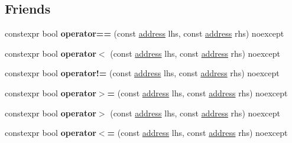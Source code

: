 \subsection*{Friends}
\begin{DoxyCompactItemize}
\item 
\mbox{\label{classdistant_1_1memory_1_1address_a8eefa780ab985fb77d69cbeaf4d82ad4}} 
constexpr bool {\bfseries operator==} (const \mbox{\hyperlink{classdistant_1_1memory_1_1address}{address}} lhs, const \mbox{\hyperlink{classdistant_1_1memory_1_1address}{address}} rhs) noexcept
\item 
\mbox{\label{classdistant_1_1memory_1_1address_ab78b2b70518bd59568ad03507bf938ae}} 
constexpr bool {\bfseries operator$<$} (const \mbox{\hyperlink{classdistant_1_1memory_1_1address}{address}} lhs, const \mbox{\hyperlink{classdistant_1_1memory_1_1address}{address}} rhs) noexcept
\item 
\mbox{\label{classdistant_1_1memory_1_1address_a2e154552a201f25abc0184f31afe1648}} 
constexpr bool {\bfseries operator!=} (const \mbox{\hyperlink{classdistant_1_1memory_1_1address}{address}} lhs, const \mbox{\hyperlink{classdistant_1_1memory_1_1address}{address}} rhs) noexcept
\item 
\mbox{\label{classdistant_1_1memory_1_1address_aa8dd8f3bdbeb0a68715bb8a824ed8257}} 
constexpr bool {\bfseries operator$>$=} (const \mbox{\hyperlink{classdistant_1_1memory_1_1address}{address}} lhs, const \mbox{\hyperlink{classdistant_1_1memory_1_1address}{address}} rhs) noexcept
\item 
\mbox{\label{classdistant_1_1memory_1_1address_a6276259f2d9b36ecdd31a4d15754fd2a}} 
constexpr bool {\bfseries operator$>$} (const \mbox{\hyperlink{classdistant_1_1memory_1_1address}{address}} lhs, const \mbox{\hyperlink{classdistant_1_1memory_1_1address}{address}} rhs) noexcept
\item 
\mbox{\label{classdistant_1_1memory_1_1address_a7a220d5b499d27f797a0bc5348270e86}} 
constexpr bool {\bfseries operator$<$=} (const \mbox{\hyperlink{classdistant_1_1memory_1_1address}{address}} lhs, const \mbox{\hyperlink{classdistant_1_1memory_1_1address}{address}} rhs) noexcept

\end{DoxyCompactItemize}
